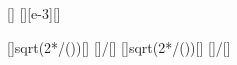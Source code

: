 [\W\per\m\squared]
[\milli\W\per\m\squared][e-3][\W\per\m\squared]

[]{sqrt(2*\IsX/(\nccX*\ncepsX))}[\V\per\m]
[]{\EsX/\nccX}[\tesla]
[]{sqrt(2*\IrX/(\nccX*\ncepsX))}[\V\per\m]
[]{\ErX/\nccX}[\tesla]

